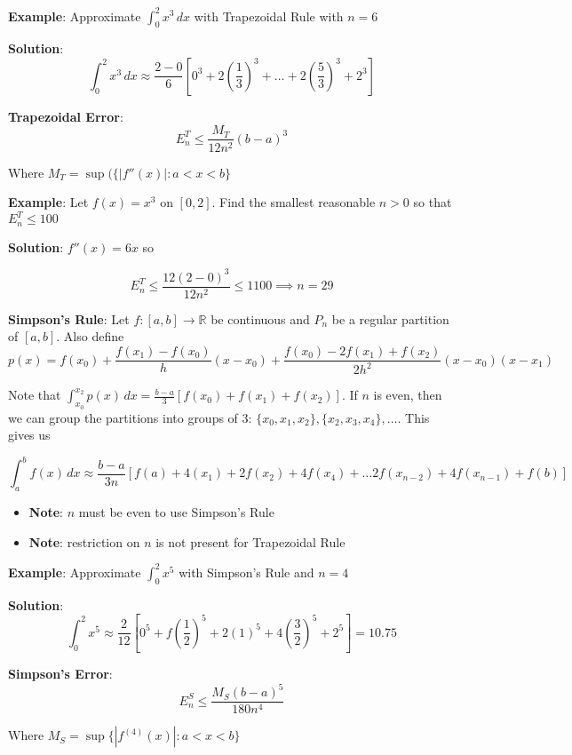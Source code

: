 \documentclass{article}
\begin{document}
      \textbf{Example}: Approximate $\int_0^2 x^3 \, dx$ with Trapezoidal Rule with $n = 6$

      \textbf{Solution}:
      \[\int_0^2 x^3 \, dx \approx \frac{2-0}{6}[0^3 + 2(\frac{1}{3})^3 + \ldots + 2(\frac{5}{3})^3 + 2^3]\]

      \textbf{Trapezoidal Error}:
      \[E^T_n \leq \frac{M_T}{12n^2}(b-a)^3\]

      Where $M_T = \sup(\{|f''(x)| \colon a < x < b\}$

      \textbf{Example}: Let $f(x) = x^3$ on $[0,2]$. Find the smallest reasonable $n >0$ so that $E^T_n \leq 100$  

      \textbf{Solution}: $f''(x) = 6x$ so

      \[E^T_n \leq \frac{12(2-0)^3}{12n^2} \leq {1}{100} \implies n = 29\] \bigskip

      \textbf{Simpson's Rule}: Let $f \colon [a,b] \rightarrow \mathbb{R}$ be continuous and $P_n$ be a regular partition of $[a,b]$. Also define
        \[ p(x) = f(x_0) + \frac{f(x_1) - f(x_0)}{h} (x-x_0) + \frac{f(x_0) - 2f(x_1) + f(x_2)}{2h^2}(x -x_0)(x-x_1)\]

        Note that $\int_{x_0}^{x_2}p(x) \, dx = \frac{b-a}{3}[f(x_0)+ f(x_1) + f(x_2)]$. If $n$ is even, then we can group the partitions into groups of 3: $\{x_0, x_1, x_2\}, \{x_2, x_3, x_4 \}, \ldots$. This gives us

        \[\int_a^b f(x) \, dx \approx \frac{b-a}{3n}[f(a) + 4(x_1) + 2f(x_2) + 4f(x_4) + \ldots 2f(x_{n-2}) + 4f(x_{n-1})+ f(b)]\]
        \begin{itemize}
          \item \textbf{Note}: $n$ must be even to use Simpson's Rule
          \item \textbf{Note}: restriction on $n$ is not present for Trapezoidal Rule
        \end{itemize}

        \textbf{Example}: Approximate $\int_0^2 x^5$ with Simpson's Rule and $n=4$

        \textbf{Solution}: 
        \[\int_0^2 x^5 \approx \frac{2}{12}[0^5 + f(\frac{1}{2})^5 + 2(1)^5 + 4(\frac{3}{2})^5 + 2^5] = 10.75\]

        \textbf{Simpson's Error}:
        \[E_n^S \leq \frac{M_S(b-a)^5}{180n^4}\] 

        Where $M_S = \sup\{|f^{(4)}(x)| \colon a < x < b\}$
\end{document}
